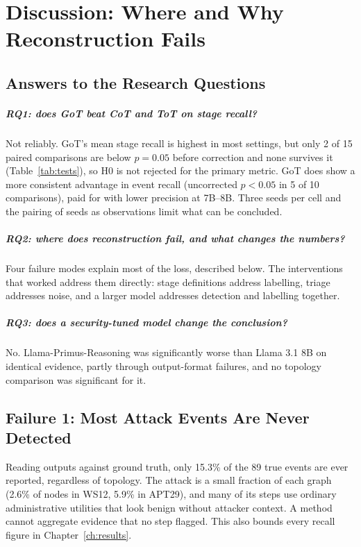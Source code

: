 \chapter{Discussion: Where and Why Reconstruction Fails}
\label{ch:discussion}

\section{Answers to the Research Questions}
\paragraph{RQ1: does GoT beat CoT and ToT on stage recall?} Not reliably. GoT's mean stage recall is highest in most settings, but only 2 of 15 paired comparisons are below $p=0.05$ before correction and none survives it (Table~\ref{tab:tests}), so H0 is not rejected for the primary metric. GoT does show a more consistent advantage in event recall (uncorrected $p<0.05$ in 5 of 10 comparisons), paid for with lower precision at 7B--8B. Three seeds per cell and the pairing of seeds as observations limit what can be concluded.
\paragraph{RQ2: where does reconstruction fail, and what changes the numbers?} Four failure modes explain most of the loss, described below. The interventions that worked address them directly: stage definitions address labelling, triage addresses noise, and a larger model addresses detection and labelling together.
\paragraph{RQ3: does a security-tuned model change the conclusion?} No. Llama-Primus-Reasoning was significantly worse than Llama 3.1 8B on identical evidence, partly through output-format failures, and no topology comparison was significant for it.

\section{Failure 1: Most Attack Events Are Never Detected}
Reading outputs against ground truth, only 15.3\% of the 89 true events are ever reported, regardless of topology. The attack is a small fraction of each graph (2.6\% of nodes in WS12, 5.9\% in APT29), and many of its steps use ordinary administrative utilities that look benign without attacker context. A method cannot aggregate evidence that no step flagged. This also bounds every recall figure in Chapter~\ref{ch:results}.

